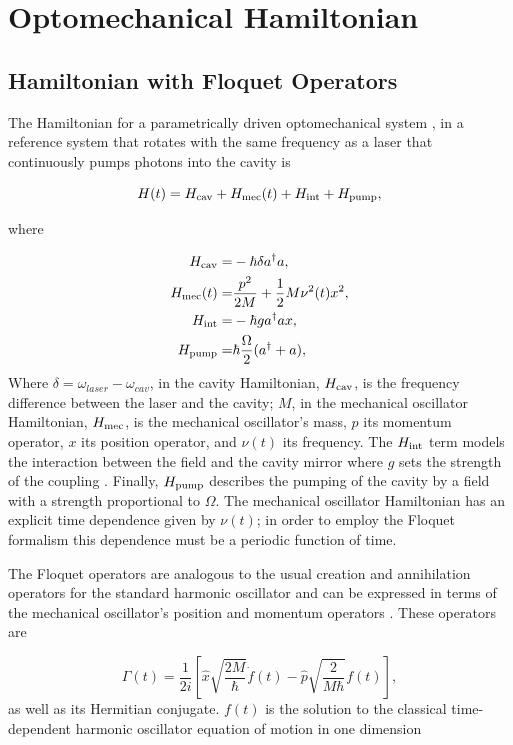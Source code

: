 \documentclass[reprint, amsmath,amssymb, aps,pra]{revtex4-1}
\begin{document}
\section{Optomechanical Hamiltonian}\label{OptmechH}
\subsection{Hamiltonian with Floquet Operators}
	
The Hamiltonian for a parametrically driven optomechanical system
\cite{LCNooshi}, in a reference system that rotates with the same
frequency as a laser that continuously pumps photons into the cavity
is

\begin{equation}
H(t) =   H_{\rm cav} + H_{\rm mec}(t) + H_{\rm int} + H_{\rm pump},
\end{equation}

where

\begin{align}
H_{\rm cav} =& -\hbar \delta a^\dagger a,\\
H_{\rm mec}(t) =& \frac{p^2}{2M} + \frac{1}{2}M \nu^2 (t) x^2,\\
H_{\rm int} =& -\hbar g a^\dagger a x,\\
H_{\rm pump} =& \hbar\frac{\Omega}{2}(a^\dagger + a),
\end{align}
Where $\delta = \omega_{laser} - \omega_{cav}$, in the cavity Hamiltonian, $H_{\rm cav}$, is the frequency difference between the laser and
the cavity; $M$, in the mechanical oscillator Hamiltonian,
$H_{\rm mec}$, is the mechanical oscillator's mass, $p$ its momentum
operator, $x$ its position operator, and $\nu(t)$ its frequency. The
$H_{\rm int}$ term models the interaction between the field and the cavity
mirror where $g$ sets the strength of the coupling \cite{KippenberCO}.
Finally, $H_{\rm pump}$ describes the pumping of the cavity by a field with
a strength proportional to $\Omega$. The mechanical oscillator Hamiltonian has an explicit time dependence given by
$\nu(t)$; in order to employ the Floquet formalism this dependence must be a
periodic function of time.

The Floquet operators are analogous to the usual creation and
annihilation operators for the standard harmonic oscillator and can be
expressed in terms of the mechanical oscillator's position and
momentum operators \cite{HanngiFM}. These operators are

\begin{equation}\label{FloquetOperators}
\Gamma(t) = \frac{1}{2i}\left[\hat{x}\sqrt{\frac{2M}{\hbar}}\dot{f}(t)-\hat{p}\sqrt{\frac{2}{M \hbar }}f(t)\right],
\end{equation} as well as its Hermitian conjugate. $f(t)$ is the solution to the classical time-dependent harmonic oscillator equation of motion in one dimension 
\end{document}
